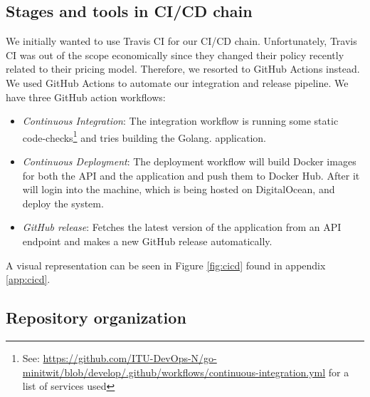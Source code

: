 \subsection{Stages and tools in CI/CD chain}
We initially wanted to use Travis CI for our CI/CD chain. Unfortunately, Travis CI was out of the scope economically since they changed their policy recently related to their pricing model. Therefore, we resorted to GitHub Actions instead. We used GitHub Actions to automate our integration and release pipeline. We have three GitHub action workflows: 
\begin{itemize}
    \item \textit{Continuous Integration}: The integration workflow is running some static code-checks\footnote{See: \url{https://github.com/ITU-DevOps-N/go-minitwit/blob/develop/.github/workflows/continuous-integration.yml} for a list of services used} and tries building the Golang. application.
    \item \textit{Continuous Deployment}: The deployment workflow will build Docker images for both the API and the application and push them to Docker Hub. After it will login into the machine, which is being hosted on DigitalOcean, and deploy the system.
    \item \textit{GitHub release}: Fetches the latest version of the application from an API endpoint and makes a new GitHub release automatically.
\end{itemize} 

A visual representation can be seen in Figure \ref{fig:cicd} found in appendix \ref{app:cicd}.







\subsection{Repository organization}

